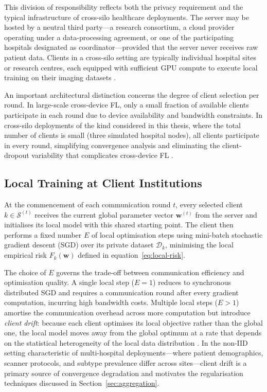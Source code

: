This division of responsibility reflects both the privacy requirement and the
typical infrastructure of cross-silo healthcare deployments.
The server may be hosted by a neutral third party---a research consortium, a
cloud provider operating under a data-processing agreement, or one of the
participating hospitals designated as coordinator---provided that the server
never receives raw patient data.
Clients in a cross-silo setting are typically individual hospital sites or
research centres, each equipped with sufficient GPU compute to execute local
training on their imaging datasets \cite{rieke2020future,kairouz2021advances}.

An important architectural distinction concerns the degree of client selection
per round.
In large-scale cross-device FL, only a small fraction of available clients
participate in each round due to device availability and bandwidth constraints.
In cross-silo deployments of the kind considered in this thesis, where the
total number of clients is small (three simulated hospital nodes), all clients
participate in every round, simplifying convergence analysis and eliminating
the client-dropout variability that complicates cross-device FL
\cite{kairouz2021advances}.


\subsection{Local Training at Client Institutions}
\label{sec:local-training}

At the commencement of each communication round $t$, every selected client
$k \in \mathcal{S}^{(t)}$ receives the current global parameter vector
$\mathbf{w}^{(t)}$ from the server and initialises its local model with this
shared starting point.
The client then performs a fixed number $E$ of local optimisation steps using
mini-batch stochastic gradient descent (SGD) over its private dataset
$\mathcal{D}_k$, minimising the local empirical risk $F_k(\mathbf{w})$ defined
in equation~\eqref{eq:local-risk}.

The choice of $E$ governs the trade-off between communication efficiency and
optimisation quality.
A single local step ($E = 1$) reduces to synchronous distributed SGD and
requires a communication round after every gradient computation, incurring high
bandwidth costs.
Multiple local steps ($E > 1$) amortise the communication overhead across more
computation but introduce \emph{client drift}: because each client optimises
its local objective rather than the global one, the local model moves away from
the global optimum at a rate that depends on the statistical heterogeneity of
the local data distribution \cite{kairouz2021advances}.
In the non-IID setting characteristic of multi-hospital deployments---where
patient demographics, scanner protocols, and subtype prevalence differ across
sites---client drift is a primary source of convergence degradation and
motivates the regularisation techniques discussed in
Section~\ref{sec:aggregation}.


